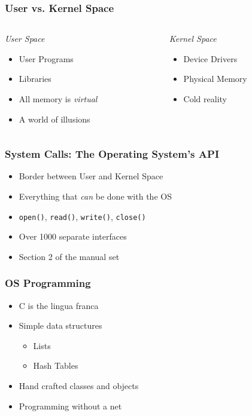 \documentclass[pdftex]{beamer} %
\begin{document}
\begin{frame}[fragile]
  \frametitle{User vs. Kernel Space}
  \begin{columns}[t]
    \begin{column}{5cm}
      \emph{User Space}
      \begin{itemize}
      \item User Programs
      \item Libraries
      \item All memory is \emph{virtual}
      \item A world of illusions
      \end{itemize}
    \end{column}
    \begin{column}{5cm}
      \emph{Kernel Space}
      \begin{itemize}
      \item Device Drivers
      \item Physical Memory
      \item Cold reality
      \end{itemize}
    \end{column}
  \end{columns}
\end{frame}

\begin{frame}[fragile]
  \frametitle{System Calls: The Operating System's API}
  \begin{itemize}
  \item Border between User and Kernel Space
  \item Everything that \emph{can} be done with the OS
  \item \verb|open()|, \verb|read()|, \verb|write()|, \verb|close()|
  \item Over 1000 separate interfaces
  \item Section 2 of the manual set
  \end{itemize}
\end{frame}

\begin{frame}
  \frametitle{OS Programming}
  \begin{itemize}
  \item C is the lingua franca
  \item Simple data structures
    \begin{itemize}
    \item Lists
    \item Hash Tables
    \end{itemize}
  \item Hand crafted classes and objects
  \item Programming without a net
  \end{itemize}
\end{frame}
\end{document}
